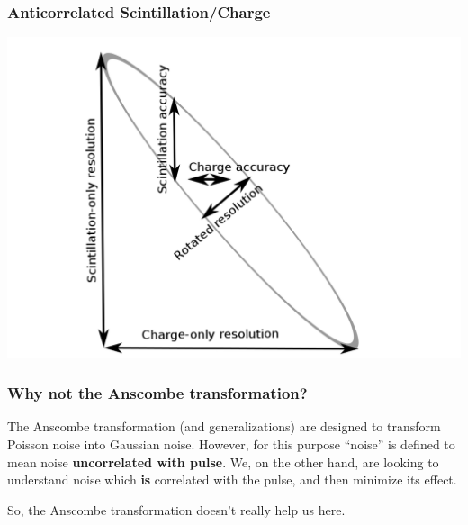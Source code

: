 \documentclass{beamer}
\begin{document}
\begin{frame}
\begin{center}
\frametitle{Anticorrelated Scintillation/Charge}
\end{center}
\vspace{.5cm}
\begin{center}
\includegraphics[keepaspectratio=true,width=\textwidth]{RotatedIsland.png}
\end{center}
\end{frame}

\begin{frame}
\begin{center}
\frametitle{Why not the Anscombe transformation?}
\end{center}
The Anscombe transformation (and generalizations) are designed to transform Poisson noise into Gaussian noise.  However, for this purpose ``noise'' is defined to mean noise {\bf uncorrelated with pulse}.  We, on the other hand, are looking to understand noise which {\bf is} correlated with the pulse, and then minimize its effect.

So, the Anscombe transformation doesn't really help us here.
\end{frame}

\end{document}
